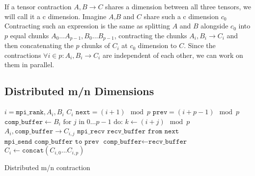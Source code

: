 If a tensor contraction $A,B \rightarrow C$ shares a dimension between all three tensors, we will call it a c dimension.
Imagine $A$,$B$ and $C$ share such a c dimension $c_0$
Contracting such an expression is the same as splitting $A$ and $B$ alongside $c_0$ into $p$ equal chunks $A_0\dots A_{p-1}, B_0\dots B_{p-1}$, contracting the chunks $A_i, B_i \rightarrow C_i$ and then concatenating the $p$ chunks of $C_i$ at $c_0$ dimension to $C$.
Since the contractions $\forall i \in p: A_i, B_i \rightarrow C_i$ are independent of each other, we can work on them in parallel.

\subsection{Distributed m/n Dimensions}

\begin{algorithm}[h]
        \begin{algorithmic}
        \Require $i = \texttt{mpi\_rank}, A_i, B_i$
        \Ensure $C_i$
        \State $\texttt{next} = (i+1) \mod p$
        \State $\texttt{prev} = (i+p-1) \mod p$
        \State $\texttt{comp\_buffer} \gets B_i$
        \State  $\text{for } j \text{ in } 0\dots p - 1 \text{ do:}$
        \State \indent $k \gets (i + j) \mod p$
        \State \indent {}
        \State \indent \indent $A_i, \texttt{comp\_buffer} \rightarrow C_{i,j}$
        \State \indent \indent $\texttt{mpi\_recv recv\_buffer from next}$
        \State \indent \indent $\texttt{mpi\_send comp\_buffer to prev}$
        \State \indent $\texttt{comp\_buffer} \gets \texttt{recv\_buffer}$
        \State $C_i \gets \texttt{concat}(C_{i,0}\dots C_{i,p})$
    \end{algorithmic}
    \caption{Distributed m/n contraction}
    \label{m_n_pseudocode}
\end{algorithm}


